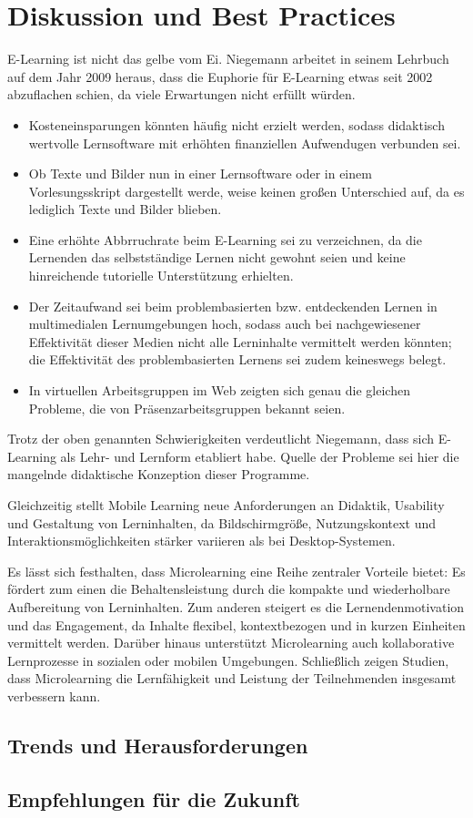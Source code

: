 \chapter{Diskussion und Best Practices}

E-Learning ist nicht das gelbe vom Ei\label{elearning}. Niegemann arbeitet in seinem Lehrbuch auf dem Jahr 2009 heraus, dass die Euphorie für E-Learning etwas seit 2002 abzuflachen schien, da viele Erwartungen nicht erfüllt würden.\parencite[S.~14]{niegemann_kompendium_2008}

\begin{itemize}
	\item Kosteneinsparungen könnten häufig nicht erzielt werden, sodass didaktisch wertvolle Lernsoftware mit erhöhten finanziellen Aufwendugen verbunden sei.
	\item Ob Texte und Bilder nun in einer Lernsoftware oder in einem Vorlesungsskript dargestellt werde, weise keinen großen Unterschied auf, da es lediglich Texte und Bilder blieben.
	\item Eine erhöhte Abbrruchrate beim E-Learning sei zu verzeichnen, da die Lernenden das selbstständige Lernen nicht gewohnt seien und keine hinreichende tutorielle Unterstützung erhielten.
	\item Der Zeitaufwand sei beim problembasierten bzw. entdeckenden Lernen in multimedialen Lernumgebungen hoch, sodass auch bei nachgewiesener Effektivität dieser Medien nicht alle Lerninhalte vermittelt werden könnten; die Effektivität des problembasierten Lernens sei zudem keineswegs belegt.
	\item In virtuellen Arbeitsgruppen im Web zeigten sich genau die gleichen Probleme, die von Präsenzarbeitsgruppen bekannt seien.
\end{itemize}

Trotz der oben genannten Schwierigkeiten verdeutlicht Niegemann, dass sich E-Learning als Lehr- und Lernform etabliert habe. Quelle der Probleme sei hier die mangelnde didaktische Konzeption dieser Programme.\parencite[S.~14]{niegemann_kompendium_2008}

Gleichzeitig stellt Mobile Learning neue Anforderungen an Didaktik, Usability und Gestaltung von Lerninhalten, da Bildschirmgröße, Nutzungskontext und Interaktionsmöglichkeiten stärker variieren als bei Desktop-Systemen.

Es lässt sich festhalten, dass Microlearning eine Reihe zentraler Vorteile bietet: Es fördert zum einen die Behaltensleistung durch die kompakte und wiederholbare Aufbereitung von Lerninhalten. Zum anderen steigert es die Lernendenmotivation und das Engagement, da Inhalte flexibel, kontextbezogen und in kurzen Einheiten vermittelt werden. Darüber hinaus unterstützt Microlearning auch kollaborative Lernprozesse in sozialen oder mobilen Umgebungen. Schließlich zeigen Studien, dass Microlearning die Lernfähigkeit und Leistung der Teilnehmenden insgesamt verbessern kann.\parencite[S.~2]{leong_review_2021}


\section{Trends und Herausforderungen}

\section{Empfehlungen für die Zukunft}
